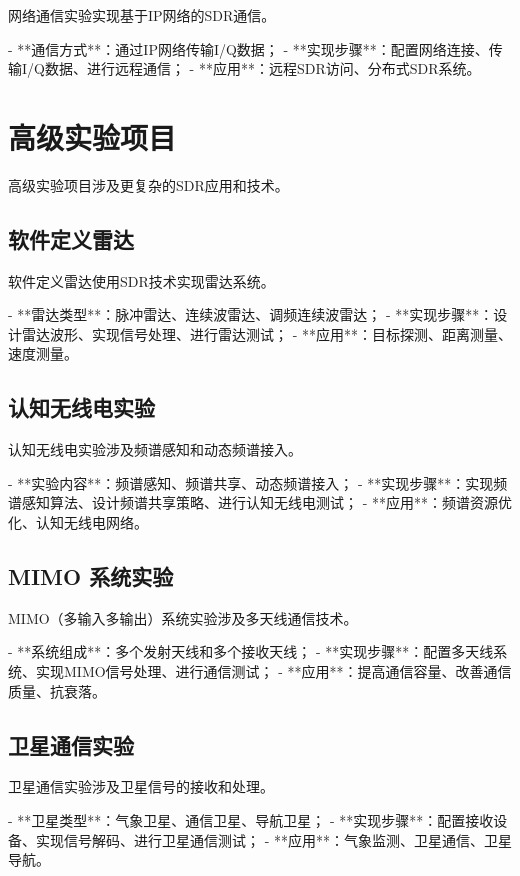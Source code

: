 ﻿\documentclass[UTF8]{ctexbook}
\begin{document}
网络通信实验实现基于IP网络的SDR通信。

- **通信方式**：通过IP网络传输I/Q数据；
- **实现步骤**：配置网络连接、传输I/Q数据、进行远程通信；
- **应用**：远程SDR访问、分布式SDR系统。

\section{高级实验项目}

高级实验项目涉及更复杂的SDR应用和技术。

\subsection{软件定义雷达}

软件定义雷达使用SDR技术实现雷达系统。

- **雷达类型**：脉冲雷达、连续波雷达、调频连续波雷达；
- **实现步骤**：设计雷达波形、实现信号处理、进行雷达测试；
- **应用**：目标探测、距离测量、速度测量。

\subsection{认知无线电实验}

认知无线电实验涉及频谱感知和动态频谱接入。

- **实验内容**：频谱感知、频谱共享、动态频谱接入；
- **实现步骤**：实现频谱感知算法、设计频谱共享策略、进行认知无线电测试；
- **应用**：频谱资源优化、认知无线电网络。

\subsection{MIMO 系统实验}

MIMO（多输入多输出）系统实验涉及多天线通信技术。

- **系统组成**：多个发射天线和多个接收天线；
- **实现步骤**：配置多天线系统、实现MIMO信号处理、进行通信测试；
- **应用**：提高通信容量、改善通信质量、抗衰落。

\subsection{卫星通信实验}

卫星通信实验涉及卫星信号的接收和处理。

- **卫星类型**：气象卫星、通信卫星、导航卫星；
- **实现步骤**：配置接收设备、实现信号解码、进行卫星通信测试；
- **应用**：气象监测、卫星通信、卫星导航。
\end{document}
